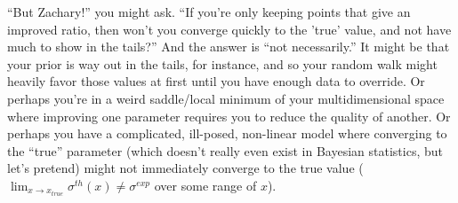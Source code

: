 ``But Zachary!'' you might ask. ``If you're only keeping points that give an improved ratio, then won't you converge quickly to the 'true' value, and not have much to show in the tails?'' And the answer is ``not necessarily.'' It might be that your prior is way out in the tails, for instance, and so your random walk might heavily favor those values at first until you have enough data to override. Or perhaps you're in a weird saddle/local minimum of your multidimensional space where improving one parameter requires you to reduce the quality of another. Or perhaps you have a complicated, ill-posed, non-linear model where converging to the ``true'' parameter (which doesn't really even exist in Bayesian statistics, but let's pretend) might not immediately converge to the true value ($\lim_{x\rightarrow x_{true}}\sigma^{th}(x) \neq \sigma^{exp}$ over some range of $x$).